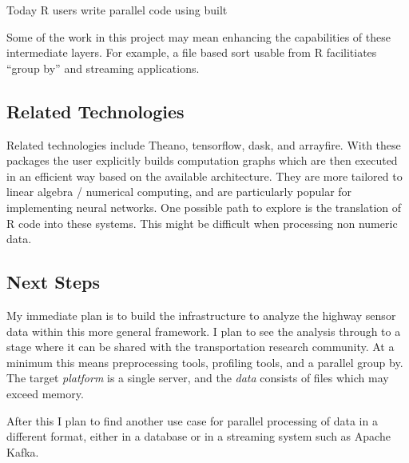 \documentclass[12pt]{article}
\begin{document}
Today R users write parallel code using built

Some of the work in this project may mean enhancing the capabilities of these
intermediate layers. For example, a file based sort usable from R facilitiates
``group by'' and streaming applications.

\subsection{Related Technologies}

Related technologies include Theano, tensorflow, dask, and arrayfire. With
these packages the user explicitly builds computation graphs which are then
executed in an efficient way based on the available architecture. They are
more tailored to linear algebra / numerical computing, and are particularly
popular for implementing neural networks. One possible path to explore is
the translation of R code into these systems. This might be difficult when
processing non numeric data.

\subsection{Next Steps}

My immediate plan is to build the infrastructure to analyze the highway
sensor data within this more general framework. I plan to see the analysis
through to a stage where it can be shared with the transportation research
community.  At a minimum this means preprocessing tools, profiling tools,
and a parallel group by. The target \emph{platform} is a single server, and
the \emph{data} consists of files which may exceed memory.

After this I plan to find another use case for parallel processing of data
in a different format, either in a database or in a streaming system such
as Apache Kafka.


 
\end{document}
